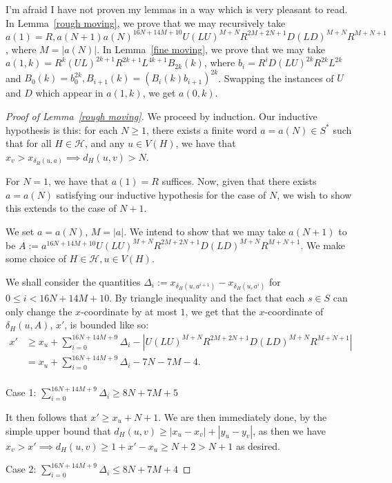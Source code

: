 \documentclass[a4paper]{article}
\theoremstyle{definition}
\begin{document}
I'm afraid I have not proven my lemmas in a way which is very pleasant to read. In Lemma~\ref*{rough moving}, we prove that we may recursively take $a(1) = R, a(N+1) a(N)^{16N+14M+10}U(LU)^{M+N}R^{2M+2N+1}D (LD)^{M+N}R^{M+N+1}$, where $M= |a(N)|$. In Lemma~\ref*{fine moving}, we prove that we may take $a(1,k) = R^k(UL)^{2k+1}R^{2k+1}L^{4k+1}B_{2k}(k)$, where $b_i = R^iD(LU)^{2k}R^{2k}L^{2k}$ and $B_0(k) = b_0^{2k}, B_{i+1}(k) = (B_i(k)b_{i+1})^{2k}$. Swapping the instances of $U$ and $D$ which appear in $a(1,k)$, we get $a(0,k)$.


\begin{proof}[Proof of Lemma~\ref*{rough moving}]
    We proceed by induction. Our inductive hypothesis is this: for each $N\ge 1$, there exists a finite word $a = a(N) \in S^*$ such that for all $H\in \mathcal{H}$, and any $u \in V(H)$, we have that $x_v > x_{\delta_H(u,a)} \implies d_H(u,v) > N$.
    
    
    For $N = 1$, we have that $a(1) = R$ suffices. Now, given that there exists $a = a(N)$ satisfying our inductive hypothesis for the case of $N$, we wish to show this extends to the case of $N+1$.
    
    We set $a = a(N)$, $M = |a|$. We intend to show that we may take $a(N+1)$ to be $A:= a^{16N+14M+10}U(LU)^{M+N}R^{2M+2N+1}D (LD)^{M+N}R^{M+N+1}$. We make some choice of $H\in \mathcal{H},u \in V(H)$. 
    
    We shall consider the quantities $\Delta_i := x_{\delta_H(u,a^{i+1})}-x_{\delta_H(u,a^i)}$ for $0\le i < 16N+14M+10$. By triangle inequality and the fact that each $s \in S$ can only change the $x$-coordinate by at most $1$, we get that the $x$-coordinate of $\delta_H(u,A)$, $x'$, is bounded like so:
    \begin{align*} x' &\ge x_u + \sum_{i=0}^{16N+14M+9} \Delta_i - |U(LU)^{M+N}R^{2M+2N+1}D (LD)^{M+N}R^{M+N+1}| \\&= x_u+\sum_{i=0}^{16N+14M+9} \Delta_i -7N-7M-4.\\\end{align*}
    
    Case 1: $\sum_{i=0}^{16N+14M+9}\Delta_i \ge 8N+7M+5$
    
    It then follows that $x' \ge x_u+N+1$. We are then immediately done, by the simple upper bound that $d_H(u,v) \ge |x_u-x_v|+|y_u-y_v|$, as then we have $x_v > x'\implies d_H(u,v)\ge 1+x'-x_u \ge N+2> N+1$ as desired.
    
    Case 2: $\sum_{i=0}^{16N+14M+9}\Delta_i \le 8N+7M+4$
    

\end{proof}
\end{document}
